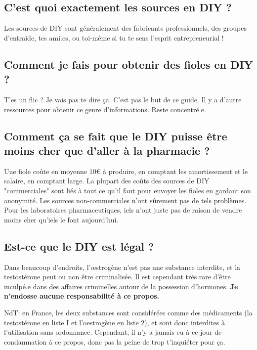 \documentclass{article}
\begin{document}
\subsection{C'est quoi exactement les sources en DIY ?}

Les sources de DIY sont généralement des fabricants professionnels, des groupes d'entraide, tes ami.es, ou toi-même si tu te sens l'esprit entrepreneurial !

\subsection{Comment je fais pour obtenir des fioles en DIY ?}

T'es un flic ? Je vais pas te dire ça. C'est pas le but de ce guide. Il y a d'autre ressources pour obtenir ce genre d'informations. Reste concentré.e.

\subsection{Comment ça se fait que le DIY puisse être moins cher que d'aller à la pharmacie ?}

Une fiole coûte en moyenne 10€ à produire, en comptant les amortissement et le salaire, en comptant large. La plupart des coûts des sources de DIY "commerciales" sont liés à tout ce qu'il faut pour envoyer les fioles en gardant son anonymité. Les sources non-commerciales n'ont sûrement pas de tels problèmes. Pour les laboratoires pharmaceutiques, iels n'ont juste pas de raison de vendre moins cher qu'iels le font aujourd'hui.

\subsection{Est-ce que le DIY est légal ?}\label{6-11}

Dans beaucoup d'endroits, l'œstrogène n'est pas une substance interdite, et la testostérone peut ou non être criminalisée. Il est cependant très rare d'être inculpé.e dans des affaires criminelles autour de la possession d'hormones. \textbf{Je n'endosse aucune responsabilité à ce propos.}

NdT: en France, les deux substances sont considérées comme des médicaments (la testostérone en liste I et l'oestrogène en liste 2), et sont donc interdites à l'utilisation sans ordonnance. Cependant, il n'y a jamais eu à ce jour de condamnation à ce propos, donc pas la peine de trop t'inquiéter pour ça.
\end{document}
